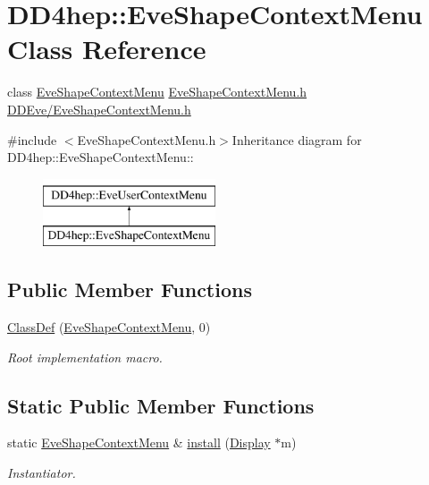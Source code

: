 \hypertarget{class_d_d4hep_1_1_eve_shape_context_menu}{
\section{DD4hep::EveShapeContextMenu Class Reference}
\label{class_d_d4hep_1_1_eve_shape_context_menu}
}


class \hyperlink{class_d_d4hep_1_1_eve_shape_context_menu}{EveShapeContextMenu} \hyperlink{_eve_shape_context_menu_8h}{EveShapeContextMenu.h} \hyperlink{_eve_shape_context_menu_8h}{DDEve/EveShapeContextMenu.h}  


{\ttfamily \#include $<$EveShapeContextMenu.h$>$}Inheritance diagram for DD4hep::EveShapeContextMenu::\begin{figure}[H]
\begin{center}
\leavevmode
\includegraphics[height=2cm]{class_d_d4hep_1_1_eve_shape_context_menu}
\end{center}
\end{figure}
\subsection*{Public Member Functions}
\begin{DoxyCompactItemize}
\item 
\hyperlink{class_d_d4hep_1_1_eve_shape_context_menu_a265ec0c7f5d3dd2f384958e32e5c51d9}{ClassDef} (\hyperlink{class_d_d4hep_1_1_eve_shape_context_menu}{EveShapeContextMenu}, 0)
\begin{DoxyCompactList}\small\item\em Root implementation macro. \item\end{DoxyCompactList}\end{DoxyCompactItemize}
\subsection*{Static Public Member Functions}
\begin{DoxyCompactItemize}
\item 
static \hyperlink{class_d_d4hep_1_1_eve_shape_context_menu}{EveShapeContextMenu} \& \hyperlink{class_d_d4hep_1_1_eve_shape_context_menu_adba9c9e666dc1c52775f59e1a423e3fa}{install} (\hyperlink{class_d_d4hep_1_1_display}{Display} $\ast$m)
\begin{DoxyCompactList}\small\item\em Instantiator. \item\end{DoxyCompactList}\end{DoxyCompactItemize}
